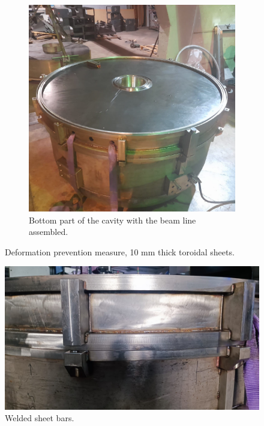 \documentclass{book}
\begin{document}
\begin{figure}
\begin{subfigure}{.5\textwidth}
      \includegraphics[width=.96\linewidth]{../../../figures/manif/toroidal_sheets/rhodo_middle_toroidal_sheets_welded_cropped.jpeg}
      \caption{Bottom part of the cavity with the beam line assembled.}
    \end{subfigure}
    \caption{Deformation prevention measure, 10 mm thick toroidal sheets.}
    \label{fig:manif_toroidal_sheets}
\end{figure}

\begin{figure}
    \captionsetup{justification=centering}
    \centering
    \includegraphics[width=.8\linewidth]{../../../figures/manif/welding/rhodo_middle_sheetbars_cropped.jpeg}
    \caption{Welded sheet bars.}
\end{figure}
\end{document}
